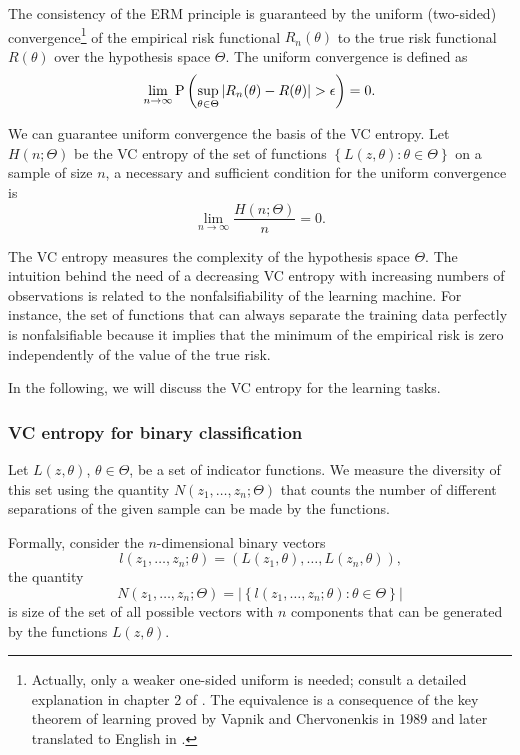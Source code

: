 The consistency of the ERM principle is guaranteed by the uniform (two-sided)
convergence\footnote{ Actually, only a weaker one-sided uniform is needed; consult a
detailed explanation in chapter 2 of .  The equivalence is a
consequence of the key theorem of learning proved by Vapnik and Chervonenkis in 1989 and
later translated to English in .} of the empirical risk functional
$R_n(\theta)$ to the true risk functional $R(\theta)$ over the hypothesis space $\Theta$.
The uniform convergence is defined as
\[
  \lim_{n \to \infty} \operatorname{P}\left(
    \sup_{\theta \in \Theta} \left| R_n(\theta) - R(\theta) \right| > \epsilon
  \right) = 0\text{.}
\]

We can guarantee uniform convergence the basis of the VC entropy.  Let $H(n; \Theta)$ be
the VC entropy of the set of functions $\left\{ L(z, \theta) : \theta \in \Theta \right\}$
on a sample of size $n$, a necessary and sufficient condition for the uniform convergence
is
\begin{equation}
  \label{eq:uniform-convergence}
  \lim_{n \to \infty} \frac{H(n; \Theta)}{n} = 0\text{.}
\end{equation}

The VC entropy measures the complexity of the hypothesis space $\Theta$.  The intuition
behind the need of a decreasing VC entropy with increasing numbers of observations is
related to the nonfalsifiability of the learning machine.  For instance, the set of
functions that can always separate the training data perfectly is nonfalsifiable because
it implies that the minimum of the empirical risk is zero independently of the value of
the true risk.

In the following, we will discuss the VC entropy for the learning tasks.

\subsubsection{VC entropy for binary classification}

Let $L(z, \theta)$, $\theta \in \Theta$, be a set of indicator functions.  We measure the
diversity of this set using the quantity $N(z_1, \dots, z_n; \Theta)$ that counts the
number of different separations of the given sample can be made by the functions.

Formally, consider the $n$-dimensional binary vectors
\[
  l(z_1, \dots, z_n; \theta) = \left( L(z_1, \theta), \dots, L(z_n, \theta) \right)\text{,}
\]
the quantity
\[
  N(z_1, \dots, z_n; \Theta) = \left| \left\{ l(z_1, \dots, z_n; \theta) : \theta \in \Theta \right\} \right|
\]
is size of the set of all possible vectors with $n$ components that can be generated by
the functions $L(z, \theta)$.

